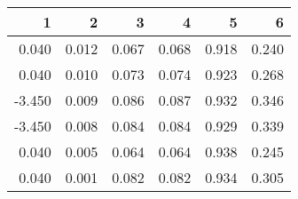 \begin{table}[ht]
\centering
\begin{tabular}{rrrrrr}
  \hline
1 & 2 & 3 & 4 & 5 & 6 \\ 
  \hline
0.040 & 0.012 & 0.067 & 0.068 & 0.918 & 0.240 \\ 
  0.040 & 0.010 & 0.073 & 0.074 & 0.923 & 0.268 \\ 
  -3.450 & 0.009 & 0.086 & 0.087 & 0.932 & 0.346 \\ 
  -3.450 & 0.008 & 0.084 & 0.084 & 0.929 & 0.339 \\ 
  0.040 & 0.005 & 0.064 & 0.064 & 0.938 & 0.245 \\ 
  0.040 & 0.001 & 0.082 & 0.082 & 0.934 & 0.305 \\ 
   \hline
\end{tabular}
\end{table}
